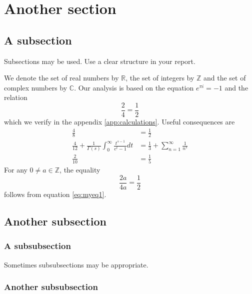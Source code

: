 \documentclass{uonmathreport}
\newcommand{\ZZ}{\mathbb{Z}}
\begin{document}
\section{Another section} \label{sec:my1}

\subsection{A subsection} \label{subsec:theory}

Subsections may be used. Use a clear structure in your report.

We denote the set of real numbers by
$\mathbb{R}$, the set of integers by $\ZZ$ and the set of complex
numbers by $\mathbb{C}$. Our analysis is based on the equation
$e^{\pi i} = -1$ and the relation
\begin{equation}
  \frac{2}{4} = \frac{1}{2}   \label{eq:myeq1}
\end{equation} %
which we verify in the appendix \ref{app:calculations}.
Useful consequences are
\begin{align}
  \frac{4}{8} &= \frac{1}{2} \\
  \frac{4}{12} + \frac{1}{\Gamma(s)}\int_0^{\infty} \frac{t^{s-1}}{e^t-1} dt
     &= \frac{1}{3} +\sum_{n=1}^{\infty} \frac{1}{n^s}\\
  \frac{2}{10} &= \frac{1}{5} 
\end{align}
For any $0\neq a\in \ZZ$, the equality
\begin{equation*} %
 \frac{2 a}{4 a} = \frac{1}{2}
\end{equation*}
follows from equation \eqref{eq:myeq1}.

\subsection{Another subsection} \label{subsec:application}

\subsubsection{A subsubsection} \label{subsubsec:red}

Sometimes subsubsections may be appropriate.

\subsubsection{Another subsubsection} \label{subsubsec:green}
\end{document}
